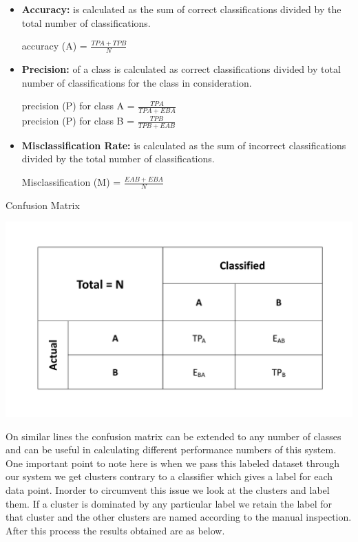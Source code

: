 \begin{itemize}
	\item \textbf{Accuracy:} is calculated as the sum of correct classifications divided by the total number of classifications.
	\begin{center}
		\centering accuracy (A) = $ \frac{TPA + TPB}{N}$
	\end{center}
	 

	\item \textbf{Precision:} of a class is calculated as correct classifications divided by total number of classifications for the class in consideration.
	\begin{center}
		\centering precision (P) for class A = $ \frac{TPA}{TPA + EBA}$ \\
		\centering precision (P) for class B = $ \frac{TPB}{TPB + EAB}$
	\end{center}
	
	\item \textbf{Misclassification Rate:} is calculated as the sum of incorrect classifications divided by the total number of classifications.
	\begin{center}
		\centering Misclassification (M) = $ \frac{EAB + EBA}{N}$
	\end{center}
	
\end{itemize}

\begin{table}[b]
	
	\caption{Confusion Matrix}%
	\centerline{\includegraphics[scale = 0.5]{confusion.pdf}}	
\end{table}
On similar lines the confusion matrix can be extended to any number of classes and can be useful in calculating different performance numbers of this system. One important point to note here is when we pass this labeled dataset through our system we get clusters contrary to a classifier which gives a label for each data point. Inorder to circumvent this issue we look at the clusters and label them. If a cluster is dominated by any particular label we retain the label for that cluster and the other clusters are named according to the manual inspection. After this process the results obtained are as below. 




